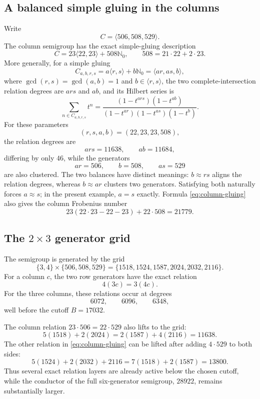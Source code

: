 \documentclass[11pt]{article}
\newcommand{\N}{\mathbb{N}_0}
\newcommand{\angles}[1]{\langle #1\rangle}
\begin{document}
\subsection{A balanced simple gluing in the columns}
Write
\[
 C=\angles{506,508,529}.
\]
The column semigroup has the exact simple-gluing description
\begin{equation}\label{eq:column-gluing}
 C=23\angles{22,23}+508\N,
 \qquad 508=21\cdot22+2\cdot23.
\end{equation}
More generally, for a simple gluing
\[
 C_{a,b,r,s}=a\angles{r,s}+b\N
             =\angles{ar,as,b},
\]
where $\gcd(r,s)=\gcd(a,b)=1$ and $b\in\angles{r,s}$,
the two complete-intersection relation degrees are $ars$ and $ab$, and
its Hilbert series is
\[
 \sum_{n\in C_{a,b,r,s}}t^n
 =\frac{(1-t^{ars})(1-t^{ab})}
 {(1-t^{ar})(1-t^{as})(1-t^b)}.
\]
For these parameters
\[
 (r,s,a,b)=(22,23,23,508),
\]
the relation degrees are
\[
 ars=11638,\qquad ab=11684,
\]
differing by only $46$, while the generators
\[
 ar=506,\qquad b=508,\qquad as=529
\]
are also clustered.  The two balances have distinct meanings:
$b\approx rs$ aligns the relation degrees, whereas $b\approx ar$ clusters
two generators.  Satisfying both naturally forces $a\approx s$; in the
present example, $a=s$ exactly.  Formula \eqref{eq:column-gluing} also gives
the column Frobenius number
\[
 23(22\cdot23-22-23)+22\cdot508=21779.
\]

\subsection{\texorpdfstring{The $2\times3$ generator grid}
                           {The two-by-three generator grid}}
The semigroup is generated by the grid
\begin{equation}\label{eq:grid}
 \{3,4\}\times\{506,508,529\}
 =
 \{1518,1524,1587,2024,2032,2116\}.
\end{equation}
For a column $c$, the two row generators have the exact relation
\[
 4(3c)=3(4c).
\]
For the three columns, these relations occur at degrees
\[
 6072,\qquad6096,\qquad6348,
\]
well before the cutoff $B=17032$.

The column relation $23\cdot506=22\cdot529$ also lifts to the grid:
\[
 5(1518)+2(2024)
 =2(1587)+4(2116)
 =11638.
\]
The other relation in \eqref{eq:column-gluing} can be lifted after adding
$4\cdot529$ to both sides:
\[
 5(1524)+2(2032)+2116
 =7(1518)+2(1587)
 =13800.
\]
Thus several exact relation layers are already active below the chosen
cutoff, while the conductor of the full six-generator semigroup,
$28922$, remains substantially larger.
\end{document}
